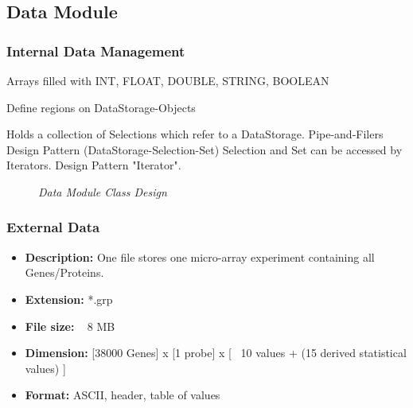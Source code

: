 \subsection{Data Module}

\subsubsection{Internal Data Management}

Arrays filled with INT, FLOAT, DOUBLE, STRING, BOOLEAN

Define regions on DataStorage-Objects

Holds a collection of Selections which refer to a DataStorage.
Pipe-and-Filers Design Pattern (DataStorage-Selection-Set)
Selection and Set can be accessed by Iterators. Design Pattern "Iterator".

\begin{figure}[ht]
\centering
{} 
\caption[Data Module Class Design]{\textit{Data Module Class Design}} 
\label{gfx:data_module_class_design}
\end{figure}

\subsubsection{External Data}


\begin{itemize}
\item \textbf{Description: } One file stores one micro-array experiment containing all Genes/Proteins.
\item \textbf{Extension:}  *.grp
\item \textbf{File size: } ~ 8 MB
\item \textbf{Dimension: } [38000 Genes] x [1 probe] x [ ~10 values + (15 derived statistical values) ]
\item \textbf{Format: } ASCII, header, table of values
\end{itemize}

